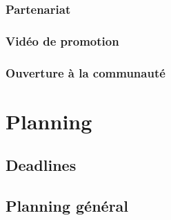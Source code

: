\documentclass[11pt]{report} %
\begin{document}
		\subsection{Partenariat}
		\subsection{Vidéo de promotion}
		\subsection{Ouverture à la communauté}
\chapter{Planning}
	\section{Deadlines}
	\section{Planning général}
\end{document}
